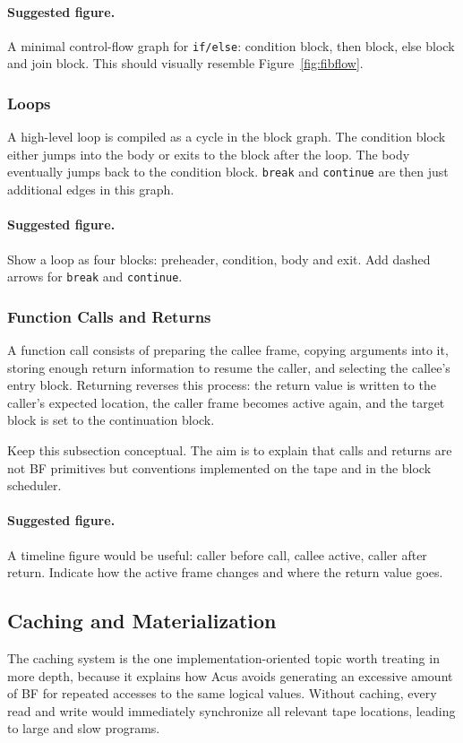 \paragraph{Suggested figure.}
A minimal control-flow graph for \texttt{if/else}: condition block, then block, else block and join block. This should visually resemble Figure~\ref{fig:fibflow}.

\subsubsection{Loops}
A high-level loop is compiled as a cycle in the block graph. The condition block either jumps into the body or exits to the block after the loop. The body eventually jumps back to the condition block. \texttt{break} and \texttt{continue} are then just additional edges in this graph.

\paragraph{Suggested figure.}
Show a loop as four blocks: preheader, condition, body and exit. Add dashed arrows for \texttt{break} and \texttt{continue}.

\subsubsection{Function Calls and Returns}
A function call consists of preparing the callee frame, copying arguments into it, storing enough return information to resume the caller, and selecting the callee's entry block. Returning reverses this process: the return value is written to the caller's expected location, the caller frame becomes active again, and the target block is set to the continuation block.

Keep this subsection conceptual. The aim is to explain that calls and returns are not BF primitives but conventions implemented on the tape and in the block scheduler.

\paragraph{Suggested figure.}
A timeline figure would be useful: caller before call, callee active, caller after return. Indicate how the active frame changes and where the return value goes.

\subsection{Caching and Materialization}
\label{sec:compiling:cache}
The caching system is the one implementation-oriented topic worth treating in more depth, because it explains how Acus avoids generating an excessive amount of BF for repeated accesses to the same logical values. Without caching, every read and write would immediately synchronize all relevant tape locations, leading to large and slow programs.

